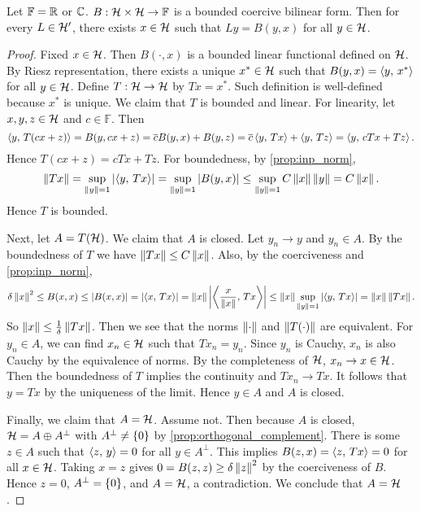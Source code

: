 \begin{theorem}
    Let $\mathbb{F} = \mathbb{R}$ or $\mathbb{C}$. $B:\mathcal{H}\times\mathcal{H}\to\mathbb{F}$ is a bounded 
    coercive bilinear form. Then for every $L\in\mathcal{H}'$, there exists $x\in\mathcal{H}$ 
    such that $Ly = B(y,x)$ for all $y\in\mathcal{H}$.
\end{theorem}
\begin{proof}
    Fixed $x\in\mathcal{H}$. Then $B(\cdot, x)$ is a bounded linear functional 
    defined on $\mathcal{H}$. By Riesz representation, there exists a unique 
    $x^*\in\mathcal{H}$ such that $B(y,x) = \left\langle {y},\, {x^*} \right\rangle$ for all $y\in\mathcal{H}$. 
    Define $T:\mathcal{H}\to\mathcal{H}$ by $Tx = x^*$. Such definition is well-defined 
    because $x^*$ is unique. We claim that $T$ is bounded and linear. 
    For linearity, let $x,y,z\in\mathcal{H}$ and $c\in\mathbb{F}$. Then 
    \begin{equation*}
        \left\langle {y},\, {T(cx + z)} \right\rangle = B(y, cx + z) = \overline{c}B(y,x) + B(y,z) 
        = \overline{c}\left\langle {y},\, {Tx} \right\rangle + \left\langle {y},\, {Tz} \right\rangle = \left\langle {y},\, {cTx + Tz} \right\rangle.
    \end{equation*}
    Hence $T(cx+z) = cTx+Tz$. For boundedness, by \cref{prop:inp_norm}, 
    \begin{equation*}
        \left\lVert {Tx} \right\rVert = \sup_{\left\lVert {y} \right\rVert=1}\left\lvert {\left\langle {y},\, {Tx} \right\rangle} \right\rvert 
        = \sup_{\left\lVert {y} \right\rVert=1}\left\lvert {B(y,x)} \right\rvert \leq \sup_{\left\lVert {y} \right\rVert=1} C\left\lVert {x} \right\rVert\left\lVert {y} \right\rVert 
        = C\left\lVert {x} \right\rVert.
    \end{equation*}
    Hence $T$ is bounded. 

    Next, let $A = T(\mathcal{H})$. We claim that $A$ is closed. Let $y_n\to y$ 
    and $y_n\in A$. By the boundedness of $T$ we have $\left\lVert {Tx} \right\rVert\leq C\left\lVert {x} \right\rVert$. 
    Also, by the coerciveness and \cref{prop:inp_norm},
    \begin{equation*}
        \delta\left\lVert {x} \right\rVert^2 \leq B(x,x) \leq \left\lvert {B(x,x)} \right\rvert 
        = \left\lvert {\left\langle {x},\, {Tx} \right\rangle} \right\rvert = \left\lVert {x} \right\rVert\left\lvert {\left\langle {\frac{x}{\left\lVert {x} \right\rVert}},\, {Tx} \right\rangle} \right\rvert 
        \leq \left\lVert {x} \right\rVert\sup_{\left\lVert {y} \right\rVert = 1} \left\lvert {\left\langle {y},\, {Tx} \right\rangle} \right\rvert = \left\lVert {x} \right\rVert\left\lVert {Tx} \right\rVert.
    \end{equation*}
    So $\left\lVert {x} \right\rVert\leq \frac{1}{\delta}\left\lVert {Tx} \right\rVert$. Then we see that 
    the norms $\left\lVert {\cdot} \right\rVert$ and $\left\lVert {T(\cdot)} \right\rVert$ are equivalent. 
    For $y_n\in A$, we can find $x_n\in\mathcal{H}$ such that $Tx_n = y_n$. 
    Since $y_n$ is Cauchy, $x_n$ is also Cauchy by the equivalence 
    of norms. By the completeness of $\mathcal{H}$, $x_n\to x\in\mathcal{H}$. 
    Then the boundedness of $T$ implies the continuity and 
    $Tx_n\to Tx$. It follows that $y = Tx$ by the uniqueness of 
    the limit. Hence $y\in A$ and $A$ is closed. 

    Finally, we claim that $A = \mathcal{H}$. Assume not. Then because 
    $A$ is closed, $\mathcal{H} = A\oplus A^{\perp}$ with $A^\perp\neq\left\{ {0} \right\}$ 
    by \cref{prop:orthogonal_complement}. There is some $z\in A$ 
    such that $\left\langle {z},\, {y} \right\rangle = 0$ for all $y\in A^\perp$. This implies 
    $B(z,x) = \left\langle {z},\, {Tx} \right\rangle = 0$ for all $x\in\mathcal{H}$. Taking $x = z$ 
    gives $0 = B(z,z) \geq \delta\left\lVert {z} \right\rVert^2$ by the coerciveness of $B$. 
    Hence $z = 0$, $A^\perp = \left\{ {0} \right\}$, and $A = \mathcal{H}$, a contradiction. 
    We conclude that $A = \mathcal{H}$. 


\end{proof}
